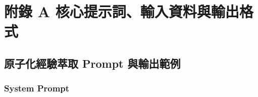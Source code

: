 \chapter*{附錄 A 核心提示詞、輸入資料與輸出格式}
{}

\setcounter{section}{0}
\renewcommand{\thesection}{A.\arabic{section}}
\renewcommand{\thesubsection}{\thesection.\arabic{subsection}}
\renewcommand{\theHsection}{appendix.A.\arabic{section}}
\renewcommand{\theHsubsection}{appendix.A.\arabic{section}.\arabic{subsection}}
\setcounter{table}{0}
\setcounter{figure}{0}
\renewcommand{\thetable}{A.\arabic{table}}
\renewcommand{\thefigure}{A.\arabic{figure}}

\section{原子化經驗萃取 Prompt 與輸出範例}
\label{app:atomic-experience-distillation-prompt}

\subsection*{System Prompt}

